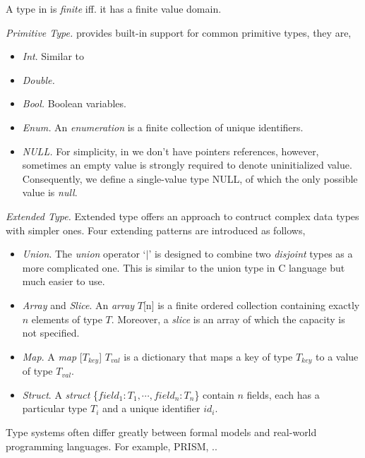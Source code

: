 \begin{definition}
    A type in \lang{} is \emph{finite} iff. it has a finite value domain.
\end{definition}


\noindent\emph{Primitive Type.} \lang{} provides built-in support for common primitive types, they are,
\begin{itemize}
    \item \emph{Int}. Similar to  
    \item \emph{Double.}
    \item \emph{Bool.} Boolean variables.
    \item \emph{Enum.} An \emph{enumeration} is a finite collection of unique identifiers.
    \item \emph{NULL.} For simplicity, in \lang{} we don't have pointers references, however, sometimes an empty value is strongly required to denote uninitialized value. Consequently, we define a single-value type NULL, of which the only possible value is \emph{null}.
\end{itemize}

\noindent\emph{Extended Type.} Extended type offers an approach to contruct complex data types with simpler ones. Four extending patterns are introduced as follows,
\begin{itemize}
    \item \emph{Union}. The \emph{union} operator `$|$' is designed to combine two \emph{disjoint} types as a more complicated one. This is similar to the union type in C language but much easier to use.
    \item \emph{Array} and \emph{Slice}. An \emph{array} $T$[n] is a finite ordered collection containing exactly $n$ elements of type $T$. Moreover, a \emph{slice} is an array of which the capacity is not specified.
    \item \emph{Map}. A \emph{map }[$T_{key}$] $T_{val}$ is a dictionary that maps a key of type $T_{key}$ to a value of type $T_{val}$.
    \item \emph{Struct}. A \emph{struct }\{$field_1:T_1,\cdots,field_n:T_n$\} contain $n$ fields, each has a particular type $T_i$ and a unique identifier $id_i$.
\end{itemize}

Type systems often differ greatly between formal models and real-world programming languages. For example, PRISM\cite{KwiatkowskaCav2011}, ..


